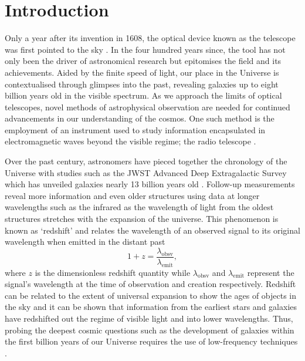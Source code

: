 
\chapter{Introduction}

\ifpdf
    \graphicspath{{introduction/figs/Raster/}{introduction/figs/PDF/}{introduction/figs/}}
\else
    \graphicspath{{introduction/figs/Vector/}{introduction/figs/}}
\fi


Only a year after its invention in 1608, the optical device known as the telescope was first pointed to the sky \citep{histTel}. In the four hundred years since, the tool has not only been the driver of astronomical research but epitomises the field and its achievements. Aided by the finite speed of light, our place in the Universe is contextualised through glimpses into the past, revealing galaxies up to eight billion years old in the visible spectrum. As we approach the limits of optical telescopes, novel methods of astrophysical observation are needed for continued advancements in our understanding of the cosmos. One such method is the employment of an instrument used to study information encapsulated in electromagnetic waves beyond the visible regime; the radio telescope \citep{smithObsAst}.

Over the past century, astronomers have pieced together the chronology of the Universe with studies such as the JWST Advanced Deep Extragalactic Survey which has unveiled galaxies nearly 13 billion years old \citep{jades}. Follow-up measurements reveal more information and even older structures using data at longer wavelengths such as the infrared \citep{abyss} as the wavelength of light from the oldest structures stretches with the expansion of the universe. This phenomenon is known as ‘redshift’ and relates the wavelength of an observed signal to its original wavelength when emitted in the distant past
\begin{equation}
    \label{eqn:redshift}
    1 + z = \frac{ \lambda_{\mathrm{obsv}} }{ \lambda_{\mathrm{emit}} },
\end{equation}
where $z$ is the dimensionless redshift quantity while $\lambda_{\mathrm{obsv}}$ and $\lambda_{\mathrm{emit}}$ represent the signal's wavelength at the time of observation and creation respectively. Redshift can be related to the extent of universal expansion to show the ages of objects in the sky and it can be shown that information from the earliest stars and galaxies have redshifted out the regime of visible light and into lower wavelengths. Thus, probing the deepest cosmic questions such as the development of galaxies within the first billion years of our Universe requires the use of low-frequency techniques \cite{furPhys}.

